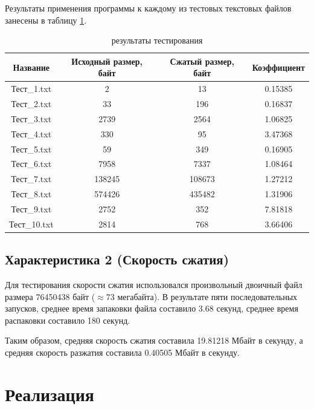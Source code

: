 \documentclass[a4paper,oneside]{article}
\theoremstyle{definition}
\begin{document}
Результаты применения программы к каждому из тестовых текстовых файлов занесены
в таблицу \ref{tbl:results}.

\begin{table}[H]
  \small
  \centering
  \begin{tabular}{|c|c|c|c|}
    \hline
    Название     & Исходный размер, байт & Сжатый размер, байт & Коэффициент \\ \hline \hline
    Тест\_1.txt  & 2           &     13      & 0.15385   \\ \hline
    Тест\_2.txt  & 33          &    196      & 0.16837   \\ \hline
    Тест\_3.txt  & 2739        &   2564      & 1.06825   \\ \hline
    Тест\_4.txt  & 330         &     95      & 3.47368   \\ \hline
    Тест\_5.txt  & 59          &    349      & 0.16905   \\ \hline
    Тест\_6.txt  & 7958        &   7337      & 1.08464   \\ \hline
    Тест\_7.txt  & 138245      & 108673      & 1.27212   \\ \hline
    Тест\_8.txt  & 574426      & 435482      & 1.31906   \\ \hline
    Тест\_9.txt  & 2752        &    352      & 7.81818   \\ \hline
    Тест\_10.txt & 2814        &    768      & 3.66406   \\ \hline
  \end{tabular}
  \caption{результаты тестирования}
  \label{tbl:results}
\end{table}

\subsection{Характеристика 2 (Скорость сжатия)}

Для тестирования скорости сжатия использовался произвольный двоичный
файл размера 76450438 байт ($\approx$73 мегабайта). В результате пяти
последовательных запусков, среднее время запаковки файла составило 3.68
секунд, среднее время распаковки составило 180 секунд.

Таким образом, средняя скорость сжатия составила 19.81218 Мбайт в секунду, а
средняя скорость разжатия составила 0.40505 Мбайт в секунду.


\section{Реализация}
\end{document}
